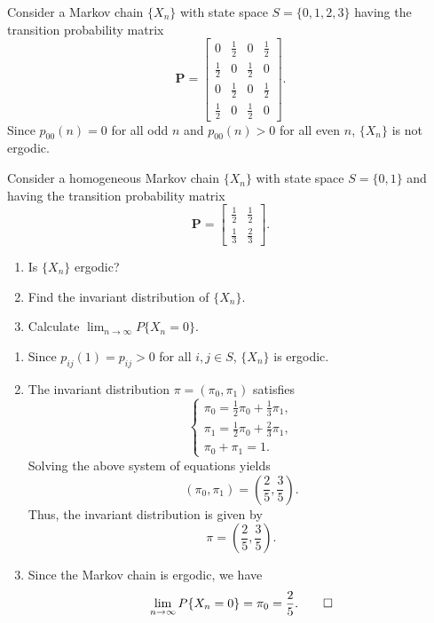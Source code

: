 \begin{example}
  Consider a Markov chain \(\{X_n\}\) with state space \(S = \{0, 1, 2, 3\}\) having the transition probability matrix
  \[
    \mathbf{P} = \begin{bmatrix}
      0 & \frac{1}{2} & 0 & \frac{1}{2} \\
      \frac{1}{2} & 0 & \frac{1}{2} & 0 \\
      0 & \frac{1}{2} & 0 & \frac{1}{2} \\
      \frac{1}{2} & 0 & \frac{1}{2} & 0
    \end{bmatrix}.
  \]
  Since \(p_{00}(n) = 0\) for all odd \(n\) and \(p_{00}(n) > 0\) for all even \(n\), \(\{X_n\}\) is not ergodic.
\end{example}

\begin{example}
  Consider a homogeneous Markov chain \(\{X_n\}\) with state space \(S = \{0, 1\}\) and having the transition probability matrix
  \[
    \mathbf{P} = \begin{bmatrix}
      \frac{1}{2} & \frac{1}{2} \\
      \frac{1}{3} & \frac{2}{3}
    \end{bmatrix}.
  \]
  \begin{enumerate}
    \item Is \(\{X_n\}\) ergodic?
    \item Find the invariant distribution of \(\{X_n\}\).
    \item Calculate \(\lim_{n \to \infty} P\{X_n = 0\}\).
  \end{enumerate}
\end{example}
\begin{solution}
  \begin{enumerate}
    \item Since \(p_{ij}(1) = p_{ij} > 0\) for all \(i, j \in S\), \(\{X_n\}\) is ergodic.
    \item The invariant distribution \(\pi = (\pi_0, \pi_1)\) satisfies
    \[
      \begin{cases}
        \pi_0 = \frac{1}{2} \pi_0 + \frac{1}{3} \pi_1, \\
        \pi_1 = \frac{1}{2} \pi_0 + \frac{2}{3} \pi_1, \\
        \pi_0 + \pi_1 = 1.
      \end{cases}
    \]
    Solving the above system of equations yields
    \[
      (\pi_0, \pi_1) = \left(\frac{2}{5}, \frac{3}{5}\right).
    \]
    Thus, the invariant distribution is given by
    \[
      \pi = \left(\frac{2}{5}, \frac{3}{5}\right).
    \]
    \item Since the Markov chain is ergodic, we have
    \[
      \lim_{n \to \infty} P\{X_n = 0\} = \pi_0 = \frac{2}{5}. \qedhere
    \]
  \end{enumerate}
\end{solution}